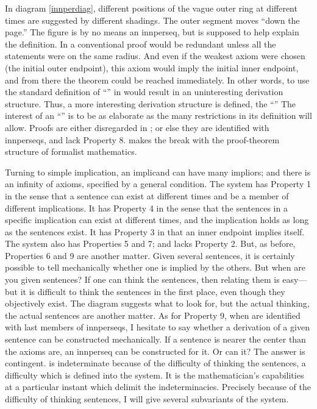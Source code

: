 In diagram \ref{innperdiag}, different positions of the vague outer 
ring at different times are suggested by different shadings. The 
outer segment moves \enquote{down the page.} The figure is by no means 
an innperseq, but is supposed to help explain the definition. 
In  a conventional proof would be redundant unless all 
the statements were on the same radius. And even if the weakest axiom were 
chosen (the initial outer endpoint), this axiom would imply the initial inner 
endpoint, and from there the theorem could be reached immediately. In 
other words, to use the standard definition of \enquote{} in  
would result in an uninteresting derivation structure. Thus, a more 
interesting derivation structure is defined, the \enquote{} The interest of 
an \enquote{} is to be as elaborate as the many restrictions in its definition 
will allow. Proofs are either disregarded in ; or else they are 
identified with innperseqs, and lack Property 8.  makes the 
break with the proof-theorem structure of formalist mathematics. 

Turning to simple implication, an implicand can have many impliors; 
and there is an infinity of axioms, specified by a general condition. The 
system has Property 1 in the sense that a sentence can exist at different 
times and be a member of different implications. It has Property 4 in the 
sense that the sentences in a specific implication can exist at different times, 
and the implication holds as long as the sentences exist. It has Property 3 in 
that an inner endpoint implies itself. The system also has Properties 5 and 7; 
and lacks Property 2. But, as before, Properties 6 and 9 are another matter. 
Given several sentences, it is certainly possible to tell mechanically whether 
one is implied by the others. But when are you given sentences? If one can 
think the sentences, then relating them is easy---but it is difficult to think the 
sentences in the first place, even though they objectively exist. The diagram 
suggests what to look for, but the actual thinking, the actual sentences are 
another matter. As for Property 9, when  are identified with last 
members of innperseqs, I hesitate to say whether a derivation of a given 
sentence can be constructed mechanically. If a sentence is nearer the center 
than the axioms are, an innperseq can be constructed for it. Or can it? The 
answer is contingent.  is indeterminate because of the difficulty 
of thinking the sentences, a difficulty which is defined into the system. It is 
the mathematician's capabilities at a particular instant which delimit the 
indeterminacies. Precisely because of the difficulty of thinking sentences, I 
will give several subvariants of the system. 

